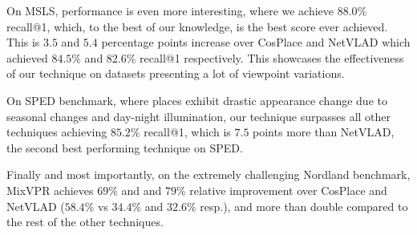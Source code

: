 \documentclass[10pt,twocolumn,letterpaper]{article}
\begin{document}
On MSLS, performance is even more interesting, where we achieve $\mathbf{88.0}$\% recall@1, which, to the best of our knowledge, is the best score ever achieved. This is $3.5$ and $5.4$ percentage points increase over CosPlace and NetVLAD which achieved $84.5$\% and $82.6$\% recall@1 respectively. This showcases the effectiveness of our technique on datasets presenting a lot of viewpoint variations.

On SPED benchmark, where places exhibit  drastic appearance change due to seasonal changes and day-night illumination, our technique surpasses all other techniques achieving $\mathbf{85.2}$\% recall@1, which is $7.5$ points more than NetVLAD, the second best performing technique on SPED. 

Finally and most importantly, on the extremely challenging Nordland benchmark, MixVPR achieves $69$\% and and $79$\% relative improvement over CosPlace and NetVLAD ($\mathbf{58.4}$\% vs $34.4$\% and $32.6$\% resp.), and more than double compared to the rest of the other techniques.
\end{document}
